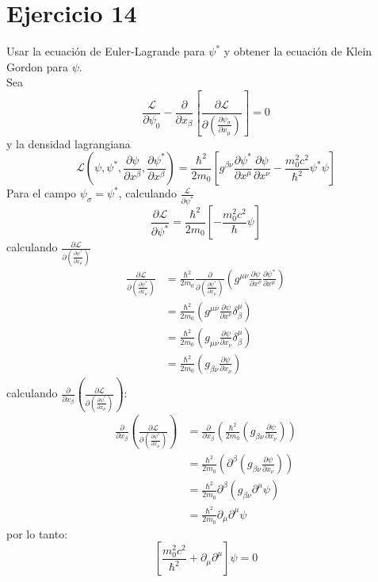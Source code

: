 \section*{Ejercicio 14}
Usar la ecuación de Euler-Lagrande para $\psi^*$ y obtener la ecuación de Klein Gordon para $\psi$.\\
Sea
\begin{equation*}
    \frac{\mathcal{L}}{\partial \psi_0} - \frac{\partial}{\partial x_\beta }\left[\frac{\partial \mathcal{L}}{\partial \left(\frac{\partial \psi_\sigma}{\partial x_\mu} \right)} \right]=0
\end{equation*}
y la densidad lagrangiana
\begin{equation*}
    \mathcal{L}\left(\psi,\psi^*, \frac{\partial \psi}{\partial x^\beta},\frac{\partial \psi^*}{\partial x^\beta} \right)= \frac{\hbar^2}{2m_0} \left[g^{\beta \nu}\frac{\partial \psi^*}{\partial x^\mu}\frac{\partial \psi}{\partial x^\nu}-\frac{m_0^2c^2}{\hbar^2}\psi^*\psi \right]
\end{equation*}
Para el campo $\psi_\sigma=\psi^*$, calculando $\frac{\mathcal{L}}{\partial \psi^*}$
\begin{equation*}
    \frac{\partial \mathcal{L}}{\partial \psi^*}=\frac{\hbar^2}{2m_0}\left[- \frac{m_0^2c^2}{\hbar}\psi \right]
\end{equation*}
calculando $\frac{\partial \mathcal{L}}{\partial \left(\frac{\partial \psi^*}{\partial x_\mu}\right)}$
\begin{align*}
    \frac{\partial \mathcal{L}}{\partial \left(\frac{\partial \psi^*}{\partial x_\mu}\right)}&= \frac{\hbar^2}{2m_0}\frac{\partial}{\partial \left(\frac{\partial \psi^*}{\partial x_\mu}\right)}\left(g^{\mu \nu}\frac{\partial \psi}{\partial x^\nu} \frac{\partial \psi^*}{\partial x^\mu}\right)\\
    &=\frac{\hbar^2}{2m_0}\left(g^{\mu \nu} \frac{\partial \psi}{\partial x^\nu} \delta_\beta^\mu\right) \\
    &=\frac{\hbar^2}{2m_0}\left(g_{\mu \nu} \frac{\partial \psi}{\partial x_\nu} \delta_\beta^\mu\right) \\
    &=\frac{\hbar^2}{2m_0}\left(g_{\beta \nu} \frac{\partial \psi}{\partial x_\nu}\right)
\end{align*}
calculando $\frac{\partial}{\partial x_\beta}\left(\frac{\partial \mathcal{L}}{\partial \left(\frac{\partial \psi^*}{\partial x_\mu}\right)}\right)$:
\begin{align*}
    \frac{\partial}{\partial x_\beta}\left(\frac{\partial \mathcal{L}}{\partial \left(\frac{\partial \psi^*}{\partial x_\mu}\right)}\right)&= \frac{\partial}{\partial x_\beta} \left(\frac{\hbar^2}{2m_0} \left(g_{\beta \nu} \frac{\partial \psi}{\partial x_\nu}\right) \right)\\
    &=\frac{\hbar^2}{2m_0}\left(\partial^\beta \left(g_{\beta \nu} \frac{\partial \psi}{\partial x_\nu} \right)\right)\\
    &=\frac{\hbar^2}{2m_0}\partial^\beta \left(g_{\beta \nu} \partial^\mu \psi \right)\\
    &=\frac{\hbar^2}{2m_0} \partial_\mu \partial^\mu \psi
\end{align*}
por lo tanto:
\begin{equation*}
    \left[\frac{m_0^2c^2}{\hbar^2}+\partial_\mu \partial^\mu \right]\psi=0
\end{equation*}